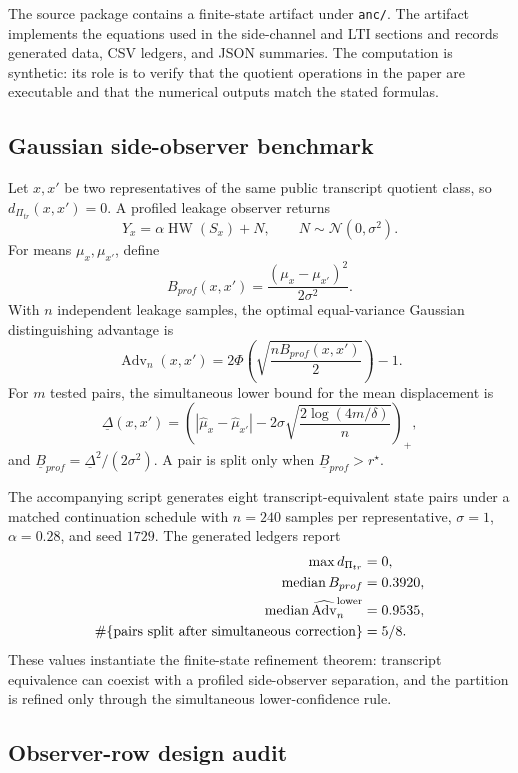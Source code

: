 \documentclass[11pt]{article}
\theoremstyle{definition}
\theoremstyle{plain}
\theoremstyle{remark}
\newcommand{\Adv}{\operatorname{Adv}}
\begin{document}
The source package contains a finite-state artifact under \texttt{anc/}. The artifact implements the equations used in the side-channel and LTI sections and records generated data, CSV ledgers, and JSON summaries. The computation is synthetic: its role is to verify that the quotient operations in the paper are executable and that the numerical outputs match the stated formulas.

\subsection{Gaussian side-observer benchmark}

Let $x,x'$ be two representatives of the same public transcript quotient class, so $d_{\Pi_{tr}}(x,x')=0$. A profiled leakage observer returns
\[
    Y_x=\alpha\operatorname{HW}(S_x)+N,
    \qquad N\sim\mathcal N(0,\sigma^2).
\]
For means $\mu_x,\mu_{x'}$, define
\[
    B_{prof}(x,x')=\frac{(\mu_x-\mu_{x'})^2}{2\sigma^2}.
\]
With $n$ independent leakage samples, the optimal equal-variance Gaussian distinguishing advantage is
\[
    \Adv_n(x,x')=2\Phi\!\left(\sqrt{\frac{nB_{prof}(x,x')}{2}}\right)-1.
\]
For $m$ tested pairs, the simultaneous lower bound for the mean displacement is
\[
    \underline\Delta(x,x')=
    \left(|\widehat\mu_x-\widehat\mu_{x'}|-2\sigma\sqrt{\frac{2\log(4m/\delta)}{n}}\right)_+,
\]
and $\underline B_{prof}=\underline\Delta^2/(2\sigma^2)$. A pair is split only when $\underline B_{prof}>r^\star$.

The accompanying script generates eight transcript-equivalent state pairs under a matched continuation schedule with $n=240$ samples per representative, $\sigma=1$, $\alpha=0.28$, and seed $1729$. The generated ledgers report
\[
\begin{aligned}
    \max d_{\Pi_{tr}} &= 0,\\
    \operatorname{median} B_{prof} &= 0.3920,\\
    \operatorname{median}\widehat{\Adv}_n^{\rm lower} &= 0.9535,\\
    \#\{\text{pairs split after simultaneous correction}\} &= 5/8.
\end{aligned}
\]
These values instantiate the finite-state refinement theorem: transcript equivalence can coexist with a profiled side-observer separation, and the partition is refined only through the simultaneous lower-confidence rule.

\subsection{Observer-row design audit}
\end{document}
